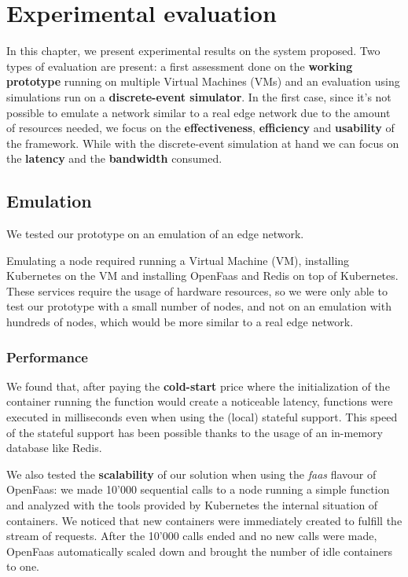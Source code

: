 \chapter{Experimental evaluation}
\label{ch:evaluation}

In this chapter, we present experimental results on the system proposed. Two types of evaluation are present: a first assessment done on the \textbf{working prototype} running on multiple Virtual Machines (VMs) and an evaluation using simulations run on a \textbf{discrete-event simulator}.
In the first case, since it's not possible to emulate a network similar to a real edge network due to the amount of resources needed, we focus on the \textbf{effectiveness}, \textbf{efficiency} and \textbf{usability} of the framework.
While with the discrete-event simulation at hand we can focus on the \textbf{latency} and the \textbf{bandwidth} consumed.



\section{Emulation}
We tested our prototype on an emulation of an edge network.

Emulating a node required running a Virtual Machine (VM), installing Kubernetes on the VM and installing OpenFaas and Redis on top of Kubernetes.
These services require the usage of hardware resources, so we were only able to test our prototype with a small number of nodes, and not on an emulation with hundreds of nodes, which would be more similar to a real edge network.


\subsection{Performance}
We found that, after paying the \textbf{cold-start} price where the initialization of the container running the function would create a noticeable latency, functions were executed in milliseconds even when using the (local) stateful support. This speed of the stateful support has been possible thanks to the usage of an in-memory database like Redis.

We also tested the \textbf{scalability} of our solution when using the \textit{faas} flavour of OpenFaas: we made 10'000 sequential calls to a node running a simple function and analyzed with the tools provided by Kubernetes the internal situation of containers. We noticed that new containers were immediately created to fulfill the stream of requests. After the 10'000 calls ended and no new calls were made, OpenFaas automatically scaled down and brought the number of idle containers to one.


